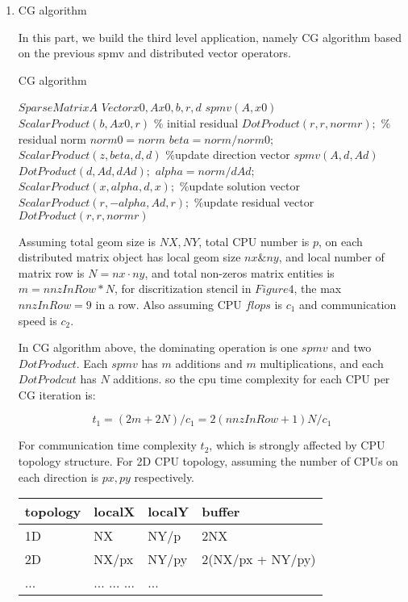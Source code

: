 \documentclass[11pt]{article}
\begin{document}
	\begin{enumerate}

	\item{CG algorithm} 

	In this part, we build the third level application, namely CG algorithm based on the previous spmv and distributed vector operators.

\begin{algorithm}
\caption{CG algorithm}
\begin{algorithmic}[1]

\State $SparseMatrix A$
\State $Vector x0, Ax0, b, r, d$ 
\State $spmv(A, x0)$ 
\State $ScalarProduct(b, Ax0, r)$ \% initial residual
\State $DotProduct(r, r, normr);$ \% residual norm
\State $norm0 = norm$ 
	\State $beta = norm/norm0;$
	\State $ScalarProduct(z, beta, d, d)$ \%update direction vector
	\State $spmv(A, d, Ad)$ 
	\State $DotProduct(d, Ad, dAd);$
	\State $alpha = norm/dAd;$
	\State $ScalarProduct(x, alpha, d, x);$ \%update solution vector
	\State $ScalarProduct(r, -alpha, Ad, r);$ \%update residual vector
	\State $DotProduct(r, r, normr)$
\EndFor
\end{algorithmic}
\end{algorithm}
	

	Assuming total geom size is $NX, NY$, total CPU number is $p$, on each distributed matrix object has local geom size $ nx \& ny$, and local number of matrix row is $N = nx \cdot ny$, and total non-zeros matrix entities is $m = nnzInRow * N$, for discritization stencil in $Figure 4$, the max $nnzInRow =9$ in a row. Also assuming CPU $flops$ is $c_1$ and communication speed is $c_2$.
	 
	In CG algorithm above, the dominating operation is one $spmv$ and two $DotProduct$. Each $spmv$ has $m$ additions and $m$ multiplications, and each $DotProdcut$ has $N$ additions. so the cpu time complexity for each CPU per CG iteration is: 

	\begin{equation}
t_1 = (2m + 2N)/c_1 = 2(nnzInRow+1)N/c_1 
	\end{equation}  

	For communication time complexity $t_2$, which is strongly affected by CPU topology structure. For 2D CPU topology, assuming the number of CPUs on each direction is $px, py$ respectively. 

\begin{center}
	\begin{tabular}{|l |l |l | l|}
	\hline
	topology & localX &   localY  & buffer \\ \hline
	1D	&  NX & NY/p & 2NX \\ \hline
	2D	&  NX/px & NY/py & 2(NX/px + NY/py)\\ \hline
	...	& 	...	... 	...		&  ... \\
	\hline
	\end{tabular}
\end{center}
 

\end{enumerate}
\end{document}
